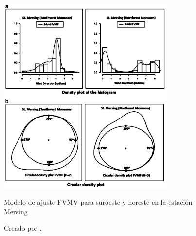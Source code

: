 \begin{figure}[h!]
    \centering    
    \includegraphics[height=100mm]{figures/wind_dir_vonMises.png} 
    \caption{Modelo de ajuste FVMV para suroeste y noreste en la estación Mersing}
    \vspace{-.25cm} 
    \caption*{Creado por \cite{Winddirelse15}.}
    \label{fig:wind_dir_vonMises}
\end{figure}

